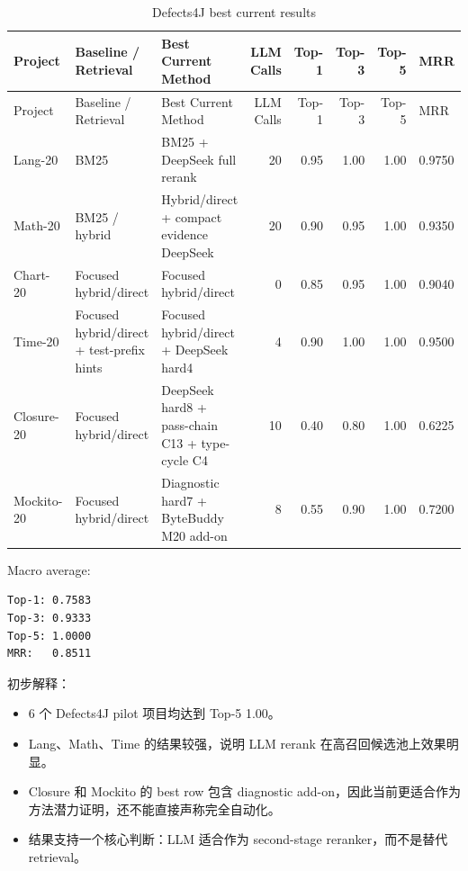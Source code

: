 \documentclass[12pt,a4paper]{ctexart}
\begin{document}
\begin{landscape}
\begin{longtable}{@{}p{2.2cm}p{4.3cm}p{5.2cm}rrrr@{}}
\caption{Defects4J best current results}
\label{tab:defects4j-results}\\
\toprule
Project & Baseline / Retrieval & Best Current Method & LLM Calls & Top-1 & Top-3 & Top-5 & MRR \\
\midrule
\endfirsthead
\toprule
Project & Baseline / Retrieval & Best Current Method & LLM Calls & Top-1 & Top-3 & Top-5 & MRR \\
\midrule
\endhead
\bottomrule
\endfoot
Lang-20 & BM25 & BM25 + DeepSeek full rerank & 20 & 0.95 & 1.00 & 1.00 & 0.9750 \\
Math-20 & BM25 / hybrid & Hybrid/direct + compact evidence DeepSeek & 20 & 0.90 & 0.95 & 1.00 & 0.9350 \\
Chart-20 & Focused hybrid/direct & Focused hybrid/direct & 0 & 0.85 & 0.95 & 1.00 & 0.9040 \\
Time-20 & Focused hybrid/direct + test-prefix hints & Focused hybrid/direct + DeepSeek hard4 & 4 & 0.90 & 1.00 & 1.00 & 0.9500 \\
Closure-20 & Focused hybrid/direct & DeepSeek hard8 + pass-chain C13 + type-cycle C4 & 10 & 0.40 & 0.80 & 1.00 & 0.6225 \\
Mockito-20 & Focused hybrid/direct & Diagnostic hard7 + ByteBuddy M20 add-on & 8 & 0.55 & 0.90 & 1.00 & 0.7200 \\
\end{longtable}
\end{landscape}

Macro average:

\begin{lstlisting}
Top-1: 0.7583
Top-3: 0.9333
Top-5: 1.0000
MRR:   0.8511
\end{lstlisting}

初步解释：

\begin{itemize}
  \item 6 个 Defects4J pilot 项目均达到 Top-5 1.00。
  \item Lang、Math、Time 的结果较强，说明 LLM rerank 在高召回候选池上效果明显。
  \item Closure 和 Mockito 的 best row 包含 diagnostic add-on，因此当前更适合作为方法潜力证明，还不能直接声称完全自动化。
  \item 结果支持一个核心判断：LLM 适合作为 second-stage reranker，而不是替代 retrieval。
\end{itemize}
\end{document}
